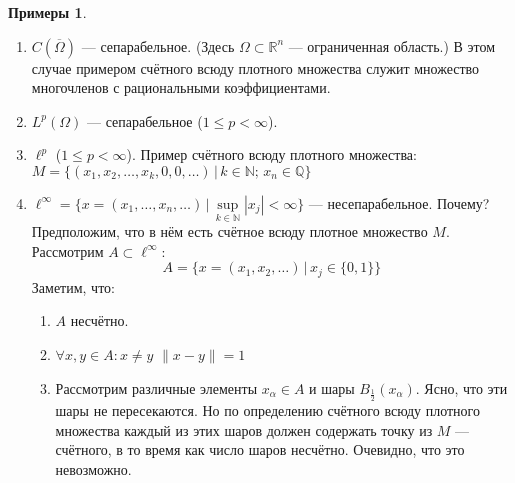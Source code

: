 \documentclass[11pt,openany,a4paper]{scrartcl}
\theoremstyle{plain}
\theoremstyle{definition}
\newtheorem{examples}[theorem]{Примеры}
\newcommand\mb{\mathbb}
\newcommand\real{\mb R}
\newcommand\ol{\overline}
\begin{document}
\begin{examples}
\mbox{}
    \begin{enumerate}
        \item $C(\ol \Omega)$ — сепарабельное.
        (Здесь $\Omega \subset \real^n$ — ограниченная область.)
        В этом случае примером счётного всюду плотного множества служит множество
        многочленов с рациональными коэффициентами.
        \item $L^p(\Omega)$ — сепарабельное ($1 \leqslant p < \infty$).
        \item $\ell^p$ ($1 \leqslant p < \infty$). Пример счётного всюду
        плотного множества:
        $M = \{(x_1, x_2,\ldots,x_k, 0, 0, \ldots)\,\big|\,
        k \in \mb N;\, x_n \in \mb Q\}$
        \item $\ell^\infty = \{x = (x_1, \ldots, x_n, \ldots)\,\big|\,
         \sup\limits_{k \in \mb N} |x_j| < \infty \}$ — несепарабельное. Почему?
         Предположим, что в нём есть счётное всюду плотное множество $M$.
         Рассмотрим $A \subset \ell^\infty$:
         $$
         A = \{x = (x_1, x_2,\ldots)\,\big|\,
         x_j \in \{0, 1\}\}
         $$
         Заметим, что:
         \begin{enumerate}
            \item $A$ несчётно.
            \item $\forall x,y\in A: x \neq y$ $\|x-y\|=1$
            \item Рассмотрим различные элементы $x_\alpha \in A$ и
            шары $B_{\frac{1}{2}}(x_\alpha)$.
            Ясно, что эти шары не пересекаются. Но по определению счётного всюду плотного множества
            каждый из этих шаров должен содержать точку из $M$ — счётного, в то время как число
            шаров несчётно. Очевидно, что это невозможно.
         \end{enumerate}
    \end{enumerate}
\end{examples}
\end{document}
